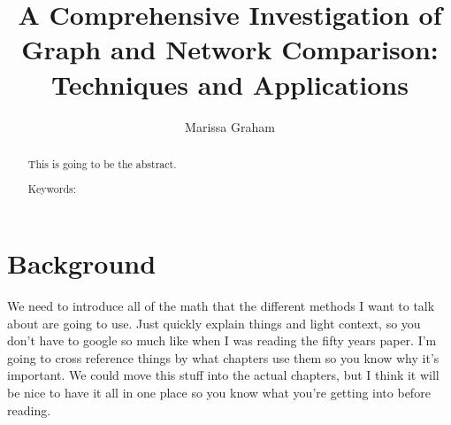 \documentclass[12pt]{thesis}
\author{Marissa Graham}
\title{A Comprehensive Investigation of Graph and Network Comparison: Techniques and Applications}
\theoremstyle{plain}
\theoremstyle{definition}
\theoremstyle{remark}
\begin{document}

\frontmatter 
\maketitle 

\begin{abstract}
This is going to be the abstract.		
\vskip 3.25in
 
\noindent Keywords: %
\end{abstract}


\tableofcontents
\listoftables
\listoffigures
\mainmatter






\chapter{Background}

We need to introduce all of the math that the different methods I want to talk about are going to use. Just quickly explain things and light context, so you don't have to google so much like when I was reading the fifty years paper. I'm going to cross reference things by what chapters use them so you know why it's important. We could move this stuff into the actual chapters, but I think it will be nice to have it all in one place so you know what you're getting into before reading.
\end{document}
